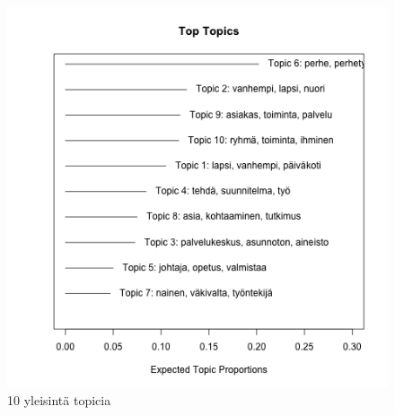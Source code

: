 

\begin{center}
\begin{figure}[ht!]

\includegraphics{top_topics.png}

\caption{10 yleisintä topicia}

\label{alb1}
\end{figure}
\end{center}
